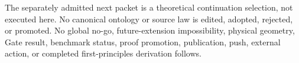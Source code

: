 \documentclass[11pt]{article}
\begin{document}
The separately admitted next packet is a theoretical continuation selection,
not executed here.  No canonical ontology or source law is edited, adopted,
rejected, or promoted.  No global no-go, future-extension impossibility,
physical geometry, Gate result, benchmark status, proof promotion,
publication, push, external action, or completed first-principles derivation
follows.
\end{document}
